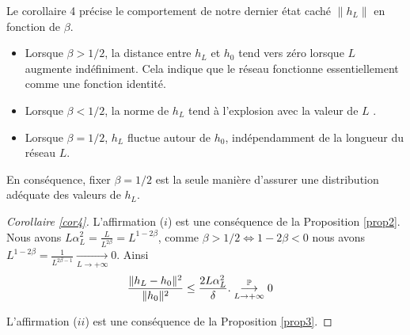 Le corollaire 4 précise le comportement de notre dernier état caché $\left\| h_L \right\|$ en fonction de $\beta$.
\begin{itemize}
    \item Lorsque $\beta > 1/2$, la distance entre $h_L$ et $h_0$ tend vers zéro lorsque $L$ augmente indéfiniment. Cela indique que le réseau fonctionne essentiellement comme une fonction identité.
    \item Lorsque $\beta < 1/2$, la norme de $h_L$ tend à l'explosion avec la valeur de $ L $ .
    \item Lorsque $\beta = 1/2$, $h_L$ fluctue autour de $h_0$, indépendamment de la longueur du réseau $L$.
\end{itemize}
En conséquence, fixer $\beta = 1/2$ est la seule manière d'assurer une distribution adéquate des valeurs de $h_L$.


\begin{proof}[Corollaire \ref{cor4}]
    L'affirmation ($ i $) est une conséquence de la Proposition \ref{prop2}. Nous avons $ L \alpha _L ^2 = \frac{L}{L^{2\beta} } = L^{1 - 2 \beta } $, comme $ \beta > 1/2 \Leftrightarrow 1 - 2 \beta < 0 $ nous avons $ L^{1 - 2 \beta } = \frac{1}{L^{2 \beta  -1}} \underset{L\to +\infty}{\longrightarrow} 0 $. Ainsi
    \begin{align*}
        & \frac{\|h_L - h_0\|^2}{\|h_0\|^2} \leq \frac{2L\alpha_L^2}{\delta}.
        \overunderset{\mathbb{P}}{L\to +\infty}{\longrightarrow} 0 
    \end{align*}

    L'affirmation ($ ii $) est une conséquence de la Proposition \ref{prop3}.
\end{proof}

